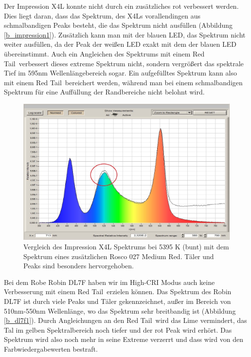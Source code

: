 Der Impression X4L konnte nicht durch ein zusätzliches rot verbessert werden. Dies liegt daran, dass das Spektrum, des X4Ls vorallendingen aus schmalbandigen Peaks besteht, die das Spektrum nicht ausfüllen (Abbildung \ref{b_impression1}). Zusätzlich kann man mit der blauen LED, das Spektrum nicht weiter ausfüllen, da der Peak der weißen LED exakt mit dem der blauen LED übereinstimmt. Auch ein Angleichen des Spektrums mit einem \glqq Red Tail\grqq\ verbessert dieses extreme Spektrum nicht, sondern vergrößert das spektrale Tief im 595nm Wellenlängebereich sogar. Ein aufgefülltes Spektrum kann also mit einem \glqq Red Tail\grqq\ bereichert werden, während man bei einem schmalbandigen Spektrum für eine Auffüllung der Randbereiche nicht belohnt wird.\\

\begin{figure}[H]     %
\centering
\includegraphics[width=1.0\textwidth]{bilder/glp1} 
\caption {Vergleich des Impression X4L Spektrums bei 5395 K (bunt) mit dem Spektrum eines zusätzlichen Rosco 027 \glqq Medium Red\grqq . Täler und Peaks sind besonders hervorgehoben.}\label{b_glp1}
\end{figure}


Bei dem Robe Robin DL7F haben wir im High-CRI Modus auch keine Verbesserung mit einem \glqq Red Tail\grqq\ erzielen können. Das Spektrum des Robin DL7F ist durch viele Peaks und Täler gekennzeichnet, außer im Bereich von 510nm-550nm Wellenlänge, wo das Spektrum sehr breitbandig ist (Abbildung \ref{b_dl7f1}). Durch Angleichungen an den \glqq Red Tail\grqq\ wird das Lime vermindert, das Tal im gelben Spektralbereich noch tiefer und der rot Peak wird erhört. Das Spektrum wird also noch mehr in seine Extreme verzerrt und dass wird von den Farbwiedergabewerten bestraft.

